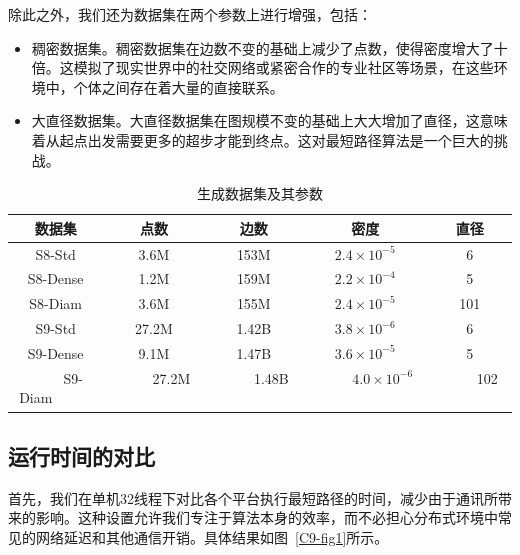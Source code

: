 除此之外，我们还为数据集在两个参数上进行增强，包括：
\begin{itemize}
    \item 稠密数据集。稠密数据集在边数不变的基础上减少了点数，使得密度增大了十倍。这模拟了现实世界中的社交网络或紧密合作的专业社区等场景，在这些环境中，个体之间存在着大量的直接联系。
    \item 大直径数据集。大直径数据集在图规模不变的基础上大大增加了直径，这意味着从起点出发需要更多的超步才能到终点。这对最短路径算法是一个巨大的挑战。
\end{itemize}

\begin{table}[h]\centering
    \def\arraystretch{1.5}
	\caption{生成数据集及其参数}
	\label{tab:syn_data}
	\begin{tabular}{c|c|c|c|c}
		\hline
		数据集 & 点数 & 边数 & 密度 & 直径 \\ \hline \hline
		S8-Std            & 3.6M       & 153M       & $2.4 \times 10^{-5}$     & 6                           \\ \hline
		S8-Dense          & 1.2M       & 159M       & $2.2 \times 10^{-4}$     & 5                           \\ \hline
		S8-Diam           & 3.6M       & 155M       & $2.4 \times 10^{-5}$     & 101                         \\ \hline
		S9-Std            & 27.2M      & 1.42B      & $3.8 \times 10^{-6}$     & 6          \\ \hline
		S9-Dense          & 9.1M       & 1.47B      & $3.6 \times 10^{-5}$     & 5                            \\ \hline
        \ \ \ \ \ S9-Diam   \ \ \ \ \  &  \ \ \ \ \ 27.2M \ \ \ \ \      &  \ \ \ \ \ 1.48B  \ \ \ \ \ &  \ \ \ \ \ $4.0 \times 10^{-6}$  \ \ \ \ \ &  \ \ \ \ \ 102   \ \ \ \ \  \\ \hline
	\end{tabular}
\end{table}


\subsection{运行时间的对比}

首先，我们在单机32线程下对比各个平台执行最短路径的时间，减少由于通讯所带来的影响。这种设置允许我们专注于算法本身的效率，而不必担心分布式环境中常见的网络延迟和其他通信开销。具体结果如图~\ref{C9-fig1}所示。

